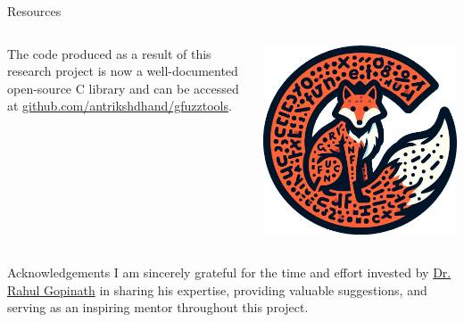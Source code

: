\documentclass{beamer}
\begin{document}
\begin{frame}{Resources}
	\begin{columns}
		\begin{column}{0.7\textwidth}
			The code produced as a result of this research project is now a well-documented open-source C library and can be accessed at \textcolor{cyan}{\href{https://github.com/antrikshdhand/gfuzztools}{github.com/antrikshdhand/gfuzztools}}.
		\end{column}
		\begin{column}{0.3\textwidth}
			\centering
			\includegraphics[width=\textwidth]{img/gfuzztools.png}
		\end{column}
	\end{columns}
\end{frame}

\begin{frame}{Acknowledgements}
	I am sincerely grateful for the time and effort invested by \textcolor{cyan}{
	\href{https://www.sydney.edu.au/engineering/about/our-people/academic-staff/rahul-gopinath.html}{Dr. Rahul Gopinath}} in sharing his expertise, providing valuable suggestions, and serving as an inspiring mentor throughout this project. 
\end{frame}
\end{document}
